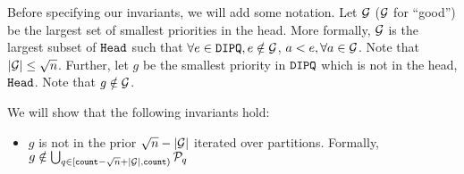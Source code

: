 Before specifying our invariants, we will add some notation. Let $\mathcal{G}$ ($\mathcal{G}$ for ``good'') be the largest set of smallest priorities in the head. More formally,
$\mathcal{G}$ is the largest subset of $\texttt{Head}$ such that $\forall e \in \texttt{DIPQ}, e \notin \mathcal{G}$, $a < e, \forall a \in \mathcal{G}$. Note that $|\mathcal{G}| \leq {\sqrt{n}}$.
Further, let $g$ be the smallest priority in $\texttt{DIPQ}$ which is not in the head, $\texttt{Head}$.
Note that $g \notin \mathcal{G}$.

We will show that the following invariants hold:
\begin{itemize}
	\item $g$ is not in the prior ${\sqrt{n}} - |\mathcal{G}|$ iterated over partitions. Formally, $g \notin \bigcup_{q \in [{\texttt{count}} - {\sqrt{n}} + |\mathcal{G}|, {\texttt{count}})} \mathcal{P}_q$
\end{itemize}

